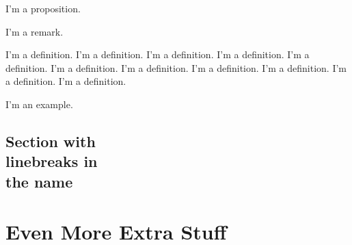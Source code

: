 \begin{proposition}
I'm a proposition.
\end{proposition}

\begin{remark}
I'm a remark. 
\end{remark}

\begin{definition}
I'm a definition. I'm a definition. I'm a definition. I'm a definition. I'm a definition. I'm a definition. I'm a definition. I'm a definition. I'm a definition. I'm a definition. I'm a definition. 
\end{definition}

\begin{example}
I'm an example.
\end{example}


\section[Optional table of contents heading]{Section with\\ linebreaks in\\the
name}


\Blindtext[2]


\chapter{Even More Extra Stuff}
\blindtext